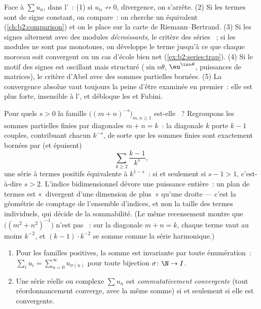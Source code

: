 \begin{method}\label{met:b2:series:choosing}
Face à $\sum u_n$, dans l'~: (1) si $u_n \not\to 0$, divergence,
on s'arrête. (2) Si les termes sont de signe constant, on compare~:
on cherche un équivalent (\cref{ch:b2:comparison}) et on le place sur
la carte de Riemann--Bertrand. (3) Si les signes alternent avec des
modules \emph{décroissants}, le critère des séries ~; si les
modules ne sont pas monotones, on développe le terme jusqu'à ce que
chaque morceau soit  convergent ou un cas d'école bien net
(\cref{ex:b2:series:trap}). (4) Si le motif des signes est oscillant
mais structuré ($\sin n\theta$, $\eu^{\iu n\theta}$, puissances de
matrices), le critère d'Abel avec des sommes partielles bornées. (5)
La convergence absolue vaut toujours la peine d'être examinée en
premier~: elle est plus forte, insensible à l', et débloque les
 et Fubini.
\end{method}

\begin{example}\label{ex:b2:series:diagonalcount}
Pour quels $s > 0$ la famille $\bigl((m + n)^{-s}\bigr)_{m, n \geq
1}$ est-elle ~? Regroupons les sommes partielles finies par
diagonales $m + n = k$~: la diagonale $k$ porte $k - 1$ couples,
contribuant chacun $k^{-s}$, de sorte que les sommes finies sont
exactement bornées par (et épuisent)
\[
\sum_{k \geq 2} \frac{k - 1}{k^{s}} ,
\]
une série à termes positifs équivalente à $k^{1-s}$~:  si et
seulement si $s - 1 > 1$, c'est-à-dire $s > 2$. L'indice
bidimensionnel dévore une puissance entière~: un plan de termes est
«~divergent d'une dimension de plus~» qu'une droite --- c'est la
géométrie de comptage de l'ensemble d'indices, et non la taille des
termes individuels, qui décide de la sommabilité. (Le même
recensement montre que $\bigl((m^2 + n^2)^{-1}\bigr)$ n'est pas
~: sur la diagonale $m + n = k$, chaque terme vaut au moins
$k^{-2}$, et $(k-1)\cdot k^{-2}$ se somme comme la série harmonique.)
\end{example}

\begin{theorem}\label{thm:b2:series:rearrangement}
\begin{enumerate}
  \item Pour les familles positives, la somme est invariante par
        toute énumération~: $\sum_{i} u_i = \sum_{n=0}^{\infty}
        u_{\sigma(n)}$ pour toute bijection $\sigma \colon \N \to I$.
  \item Une série réelle ou complexe $\sum u_n$ est \emph{commutativement
        convergente} (tout réordonnancement converge, avec la même
        somme) si et seulement si elle est  convergente.
\end{enumerate}
\end{theorem}

